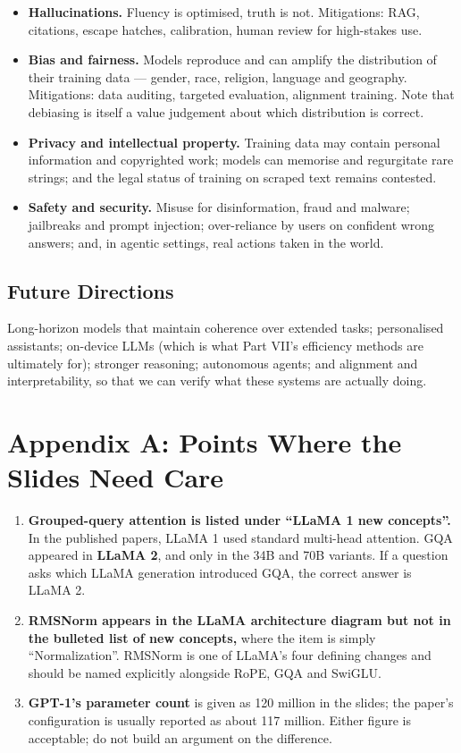 \documentclass[11pt,a4paper]{article}
\begin{document}
\begin{itemize}
\item \textbf{Hallucinations.} Fluency is optimised, truth is not. Mitigations: RAG,
  citations, escape hatches, calibration, human review for high-stakes use.
\item \textbf{Bias and fairness.} Models reproduce and can amplify the distribution of their
  training data --- gender, race, religion, language and geography. Mitigations: data
  auditing, targeted evaluation, alignment training. Note that debiasing is itself a value
  judgement about which distribution is correct.
\item \textbf{Privacy and intellectual property.} Training data may contain personal
  information and copyrighted work; models can memorise and regurgitate rare strings; and the
  legal status of training on scraped text remains contested.
\item \textbf{Safety and security.} Misuse for disinformation, fraud and malware; jailbreaks
  and prompt injection; over-reliance by users on confident wrong answers; and, in agentic
  settings, real actions taken in the world.
\end{itemize}

\subsection{Future Directions}

Long-horizon models that maintain coherence over extended tasks; personalised assistants;
on-device LLMs (which is what Part VII's efficiency methods are ultimately for); stronger
reasoning; autonomous agents; and alignment and interpretability, so that we can verify what
these systems are actually doing.

\section{Appendix A: Points Where the Slides Need Care}
\label{sec:pitfalls}

\begin{enumerate}
\item \textbf{Grouped-query attention is listed under ``LLaMA 1 new concepts''.} In the
  published papers, LLaMA 1 used standard multi-head attention. GQA appeared in
  \textbf{LLaMA 2}, and only in the 34B and 70B variants. If a question asks which LLaMA
  generation introduced GQA, the correct answer is LLaMA 2.
\item \textbf{RMSNorm appears in the LLaMA architecture diagram but not in the bulleted list
  of new concepts,} where the item is simply ``Normalization''. RMSNorm is one of LLaMA's four
  defining changes and should be named explicitly alongside RoPE, GQA and SwiGLU.
\item \textbf{GPT-1's parameter count} is given as 120 million in the slides; the paper's
  configuration is usually reported as about 117 million. Either figure is acceptable; do not
  build an argument on the difference.
\end{enumerate}
\end{document}
